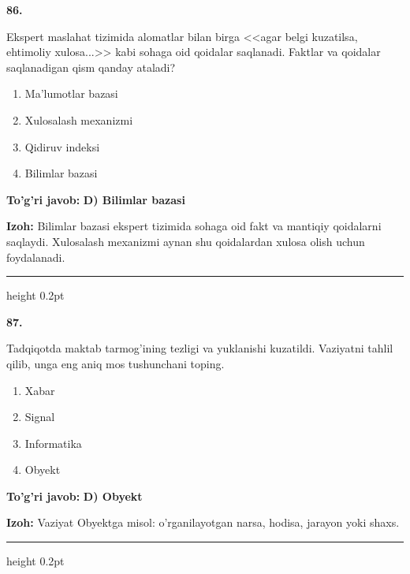 \documentclass[10pt,a4paper,oneside]{article}
\begin{document}
\noindent\textbf{\color{ink}86.}
\par
Ekspert maslahat tizimida alomatlar bilan birga <<agar belgi kuzatilsa, ehtimoliy xulosa...>> kabi sohaga oid qoidalar saqlanadi. Faktlar va qoidalar saqlanadigan qism qanday ataladi?
\begin{enumerate}[label=\Alph*),leftmargin=9mm]
\item Ma'lumotlar bazasi
\item Xulosalash mexanizmi
\item Qidiruv indeksi
\item Bilimlar bazasi
\end{enumerate}
\begin{tcolorbox}[enhanced,breakable,colback=teal!4,colframe=teal!50!black,boxrule=0.5pt,arc=1.1mm,left=3mm,right=3mm,top=1.7mm,bottom=1.7mm,before skip=2mm,after skip=2mm]
\textbf{\color{teal}To'g'ri javob:} \textbf{D) Bilimlar bazasi}
\par\smallskip
\textbf{Izoh:} Bilimlar bazasi ekspert tizimida sohaga oid fakt va mantiqiy qoidalarni saqlaydi. Xulosalash mexanizmi aynan shu qoidalardan xulosa olish uchun foydalanadi.
\end{tcolorbox}
\vspace{2mm}\hrule height 0.2pt \vspace{3mm}

\noindent\textbf{\color{ink}87.}
\par
Tadqiqotda maktab tarmog'ining tezligi va yuklanishi kuzatildi. Vaziyatni tahlil qilib, unga eng aniq mos tushunchani toping.
\begin{enumerate}[label=\Alph*),leftmargin=9mm]
\item Xabar
\item Signal
\item Informatika
\item Obyekt
\end{enumerate}
\begin{tcolorbox}[enhanced,breakable,colback=teal!4,colframe=teal!50!black,boxrule=0.5pt,arc=1.1mm,left=3mm,right=3mm,top=1.7mm,bottom=1.7mm,before skip=2mm,after skip=2mm]
\textbf{\color{teal}To'g'ri javob:} \textbf{D) Obyekt}
\par\smallskip
\textbf{Izoh:} Vaziyat Obyektga misol: o'rganilayotgan narsa, hodisa, jarayon yoki shaxs.
\end{tcolorbox}
\vspace{2mm}\hrule height 0.2pt \vspace{3mm}
\end{document}
